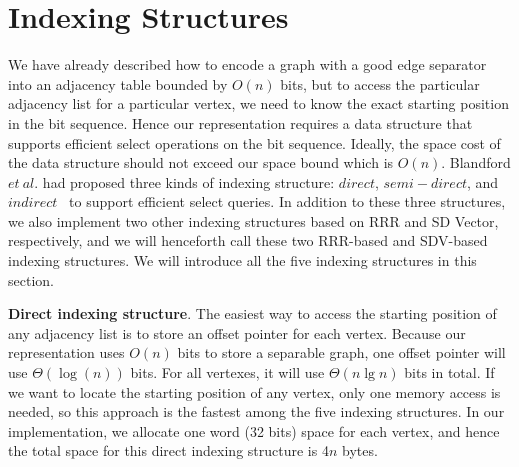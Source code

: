 \documentclass[12pt,glossary]{dalthesis}
\begin{document}
\section{Indexing Structures}

We have already described how to encode a graph with a good edge separator into an adjacency table bounded by $O(n)$ bits, but to access the particular adjacency list for a particular vertex, we need to know the exact starting position in the bit sequence. Hence our representation requires a data structure that supports efficient select operations on the bit sequence. Ideally, the space cost of the data structure should not exceed our space bound which is $O(n)$. Blandford $et \ al.$ had proposed three kinds of indexing structure: $direct$, $semi-direct$, and $indirect$~\cite{compact-representation} to support efficient select queries. In addition to these three structures, we also implement two other indexing structures based on RRR and SD Vector, respectively, and we will henceforth call these two RRR-based and SDV-based indexing structures. We will introduce all the five indexing structures in this section.

\bigskip
\bigskip

\textbf{Direct indexing structure}. The easiest way to access the starting position of 
any adjacency list is to store an offset pointer for each vertex. Because our representation uses $O(n)$ bits to store a separable graph, one offset pointer will use $\Theta (\log (n))$ bits. For all vertexes, it will use $ \Theta (n\lg n)$ bits in total. If we want to locate the starting position of any vertex, only one memory access is needed, so this approach is the fastest among the five indexing structures. In our implementation, we allocate one word (32 bits) space for each vertex, and hence the total space for this direct indexing structure is 4$n$ bytes.

\bigskip
\bigskip
\end{document}
